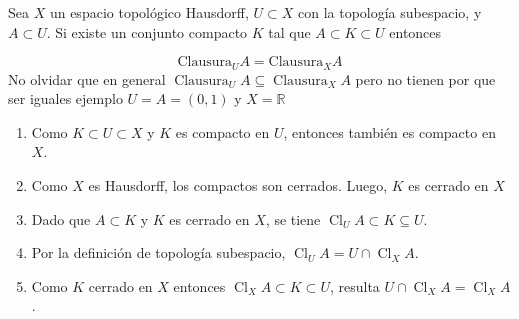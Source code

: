 \label{blk:83d0e9}
\begin{bookexercise}{}
Sea $X$ un espacio topológico Hausdorff, $U\subset X$ con la topología subespacio, y $A\subset U$. Si existe un conjunto compacto $K$ tal que $A\subset K\subset U$ entonces

\[
\text{Clausura}_{U} A=\text{Clausura}_{X} A
\]
No olvidar que en general $\operatorname{Clausura}_{U}A \subseteq \operatorname{Clausura}_{X}A$ pero no tienen por que ser iguales ejemplo $U=A=(0,1)$ y $X=\mathbb{R}$

\end{bookexercise}
\begin{bookproof}{}
\begin{enumerate}
\item Como $K\subset U\subset X$ y $K$ es compacto en $U$, entonces también es compacto en $X$.
\item Como $X$ es Hausdorff, los compactos son cerrados. Luego, $K$ es cerrado en $X$
\item Dado que $A\subset K$ y $K$ es cerrado en $X$, se tiene $\operatorname{Cl}_{U} A\subset K\subseteq U$.
\item Por la definición de topología subespacio, $\operatorname{Cl}_{U} A=U\cap\operatorname{Cl}_{X} A$.
\item Como $K$ cerrado en $X$ entonces $\operatorname{Cl}_{X} A\subset K\subset U$, resulta $U\cap\operatorname{Cl}_{X} A=\operatorname{Cl}_{X} A$.
\end{enumerate}
\bookqed
\end{bookproof}
